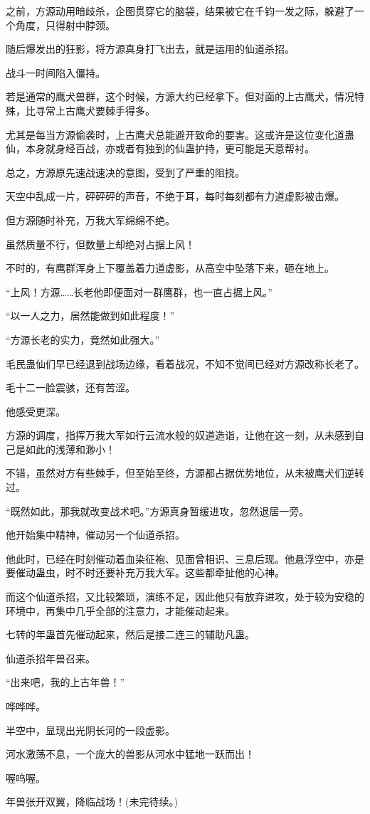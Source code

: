 \begin{this_body}
之前，方源动用暗歧杀，企图贯穿它的脑袋，结果被它在千钧一发之际，躲避了一个角度，只得射中脖颈。

随后爆发出的狂影，将方源真身打飞出去，就是运用的仙道杀招。

战斗一时间陷入僵持。

若是通常的鹰犬兽群，这个时候，方源大约已经拿下。但对面的上古鹰犬，情况特殊，比寻常上古鹰犬要棘手得多。

尤其是每当方源偷袭时，上古鹰犬总能避开致命的要害。这或许是这位变化道蛊仙，本身就身经百战，亦或者有独到的仙蛊护持，更可能是天意帮衬。

总之，方源原先速战速决的意图，受到了严重的阻挠。

天空中乱成一片，砰砰砰的声音，不绝于耳，每时每刻都有力道虚影被击爆。

但方源随时补充，万我大军绵绵不绝。

虽然质量不行，但数量上却绝对占据上风！

不时的，有鹰群浑身上下覆盖着力道虚影，从高空中坠落下来，砸在地上。

“上风！方源……长老他即便面对一群鹰群，也一直占据上风。”

“以一人之力，居然能做到如此程度！”

“方源长老的实力，竟然如此强大。”

毛民蛊仙们早已经退到战场边缘，看着战况，不知不觉间已经对方源改称长老了。

毛十二一脸震骇，还有苦涩。

他感受更深。

方源的调度，指挥万我大军如行云流水般的奴道造诣，让他在这一刻，从未感到自己是如此的浅薄和渺小！

不错，虽然对方有些棘手，但至始至终，方源都占据优势地位，从未被鹰犬们逆转过。

“既然如此，那我就改变战术吧。”方源真身暂缓进攻，忽然退居一旁。

他开始集中精神，催动另一个仙道杀招。

他此时，已经在时刻催动着血染征袍、见面曾相识、三息后现。他悬浮空中，亦是要催动蛊虫，时不时还要补充万我大军。这些都牵扯他的心神。

而这个仙道杀招，又比较繁琐，演练不足，因此他只有放弃进攻，处于较为安稳的环境中，再集中几乎全部的注意力，才能催动起来。

七转的年蛊首先催动起来，然后是接二连三的辅助凡蛊。

仙道杀招年兽召来。

“出来吧，我的上古年兽！”

哗哗哗。

半空中，显现出光阴长河的一段虚影。

河水激荡不息，一个庞大的兽影从河水中猛地一跃而出！

喔呜喔。

年兽张开双翼，降临战场！(未完待续。)

\end{this_body}

